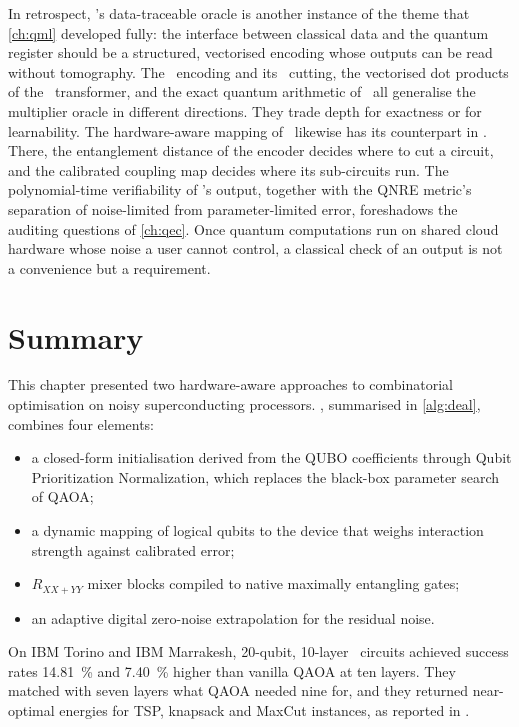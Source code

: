 In retrospect, \qawa's data-traceable oracle is another instance of the theme that \cref{ch:qml} developed fully: the interface between classical data and the quantum register should be a structured, vectorised encoding whose outputs can be read without tomography. The \qcrank\ encoding and its \shardq\ cutting, the vectorised dot products of the \vqt\ transformer, and the exact quantum arithmetic of \nnqa\ all generalise the multiplier oracle in different directions. They trade depth for exactness or for learnability. The hardware-aware mapping of \deal\ likewise has its counterpart in \shardq. There, the entanglement distance of the encoder decides where to cut a circuit, and the calibrated coupling map decides where its sub-circuits run. The polynomial-time verifiability of \qawa's output, together with the QNRE metric's separation of noise-limited from parameter-limited error, foreshadows the auditing questions of \cref{ch:qec}. Once quantum computations run on shared cloud hardware whose noise a user cannot control, a classical check of an output is not a convenience but a requirement.

\section{Summary}\label{sec:nisq:summary}

This chapter presented two hardware-aware approaches to combinatorial optimisation on noisy superconducting processors. \deal, summarised in \cref{alg:deal}, combines four elements:
\begin{itemize}
\item a closed-form initialisation derived from the QUBO coefficients through Qubit Prioritization Normalization, which replaces the black-box parameter search of QAOA;
\item a dynamic mapping of logical qubits to the device that weighs interaction strength against calibrated error;
\item $R_{XX+YY}$ mixer blocks compiled to native maximally entangling gates;
\item an adaptive digital zero-noise extrapolation for the residual noise.
\end{itemize}
On IBM Torino and IBM Marrakesh, 20-qubit, 10-layer \deal\ circuits achieved success rates \SI{14.81}{\percent} and \SI{7.40}{\percent} higher than vanilla QAOA at ten layers. They matched with seven layers what QAOA needed nine for, and they returned near-optimal energies for TSP, knapsack and MaxCut instances, as reported in \cite{guo2025deal}.

